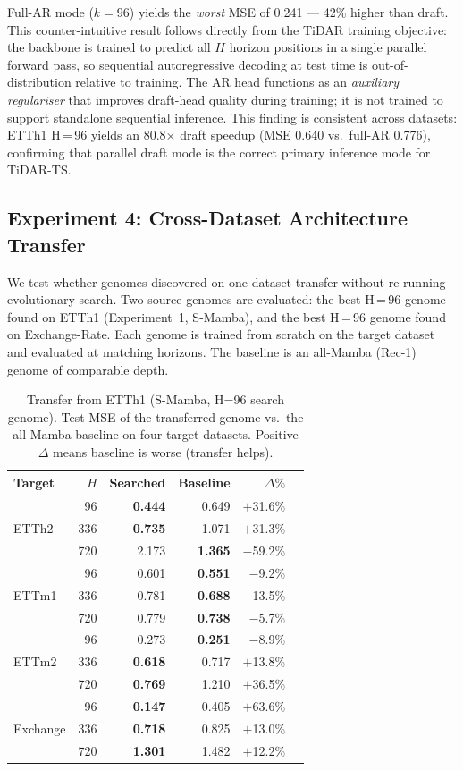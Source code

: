 Full-AR mode ($k=96$) yields the \emph{worst} MSE of 0.241 — 42\% higher than draft.
This counter-intuitive result follows directly from the TiDAR training objective: the backbone is trained to predict all $H$ horizon positions in a single parallel forward pass, so sequential autoregressive decoding at test time is out-of-distribution relative to training.
The AR head functions as an \emph{auxiliary regulariser} that improves draft-head quality during training; it is not trained to support standalone sequential inference.
This finding is consistent across datasets: ETTh1 H\,=\,96 yields an 80.8$\times$ draft speedup (MSE 0.640 vs.\ full-AR 0.776), confirming that parallel draft mode is the correct primary inference mode for TiDAR-TS.

\subsection{Experiment 4: Cross-Dataset Architecture Transfer}
\label{sec:generalization}

We test whether genomes discovered on one dataset transfer without re-running evolutionary search.
Two source genomes are evaluated: the best H\,=\,96 genome found on ETTh1 (Experiment~1, S-Mamba), and the best H\,=\,96 genome found on Exchange-Rate.
Each genome is trained from scratch on the target dataset and evaluated at matching horizons.
The baseline is an all-Mamba (Rec-1) genome of comparable depth.

\begin{table}[t]
\caption{Transfer from ETTh1 (S-Mamba, H=96 search genome). Test MSE of the transferred genome vs.\ the all-Mamba baseline on four target datasets. Positive $\Delta$ means baseline is worse (transfer helps).}
\label{tab:exp5_from_etth}
\centering
\small
\setlength{\tabcolsep}{4pt}
\begin{tabular}{lrrrrr}
\toprule
Target & $H$ & Searched & Baseline & $\Delta\%$ \\
\midrule
\multirow{3}{*}{ETTh2}
 & 96  & \textbf{0.444} & 0.649 & $+$31.6\% \\
 & 336 & \textbf{0.735} & 1.071 & $+$31.3\% \\
 & 720 & 2.173 & \textbf{1.365} & $-$59.2\% \\
\midrule
\multirow{3}{*}{ETTm1}
 & 96  & 0.601 & \textbf{0.551} & $-$9.2\% \\
 & 336 & 0.781 & \textbf{0.688} & $-$13.5\% \\
 & 720 & 0.779 & \textbf{0.738} & $-$5.7\% \\
\midrule
\multirow{3}{*}{ETTm2}
 & 96  & 0.273 & \textbf{0.251} & $-$8.9\% \\
 & 336 & \textbf{0.618} & 0.717 & $+$13.8\% \\
 & 720 & \textbf{0.769} & 1.210 & $+$36.5\% \\
\midrule
\multirow{3}{*}{Exchange}
 & 96  & \textbf{0.147} & 0.405 & $+$63.6\% \\
 & 336 & \textbf{0.718} & 0.825 & $+$13.0\% \\
 & 720 & \textbf{1.301} & 1.482 & $+$12.2\% \\
\bottomrule
\end{tabular}
\end{table}

